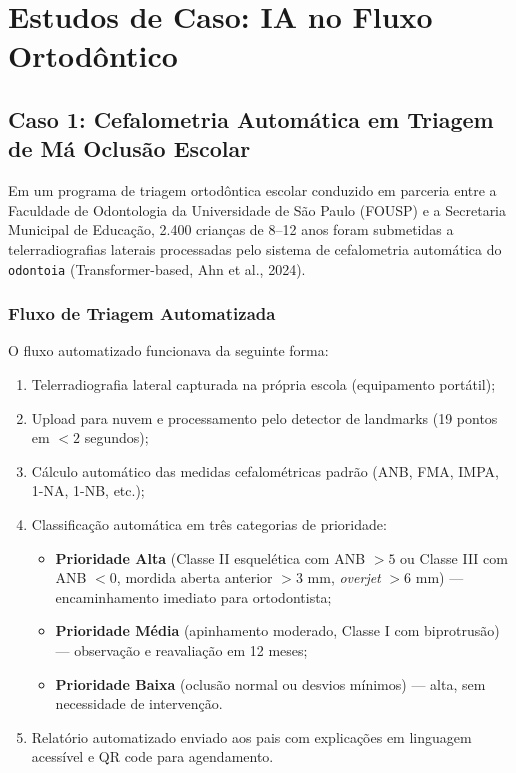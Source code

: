 
\section{Estudos de Caso: IA no Fluxo Ortodôntico}

\subsection{Caso 1: Cefalometria Automática em Triagem de Má Oclusão Escolar}

Em um programa de triagem ortodôntica escolar conduzido em parceria entre a Faculdade de Odontologia da Universidade de São Paulo (FOUSP) e a Secretaria Municipal de Educação, 2.400 crianças de 8--12 anos foram submetidas a telerradiografias laterais processadas pelo sistema de cefalometria automática do \texttt{odontoia} (Transformer-based, Ahn et al., 2024).

\subsubsection{Fluxo de Triagem Automatizada}

O fluxo automatizado funcionava da seguinte forma:
\begin{enumerate}
    \item Telerradiografia lateral capturada na própria escola (equipamento portátil);
    \item Upload para nuvem e processamento pelo detector de landmarks (19 pontos em $<2$ segundos);
    \item Cálculo automático das medidas cefalométricas padrão (ANB, FMA, IMPA, 1-NA, 1-NB, etc.);
    \item Classificação automática em três categorias de prioridade:
    \begin{itemize}
        \item \textbf{Prioridade Alta} (Classe II esquelética com ANB $> 5$\textdegree{} ou Classe III com ANB $< 0$\textdegree{}, mordida aberta anterior $>3$ mm, \textit{overjet} $>6$ mm) --- encaminhamento imediato para ortodontista;
        \item \textbf{Prioridade Média} (apinhamento moderado, Classe I com biprotrusão) --- observação e reavaliação em 12 meses;
        \item \textbf{Prioridade Baixa} (oclusão normal ou desvios mínimos) --- alta, sem necessidade de intervenção.
    \end{itemize}
    \item Relatório automatizado enviado aos pais com explicações em linguagem acessível e QR code para agendamento.
\end{enumerate}

